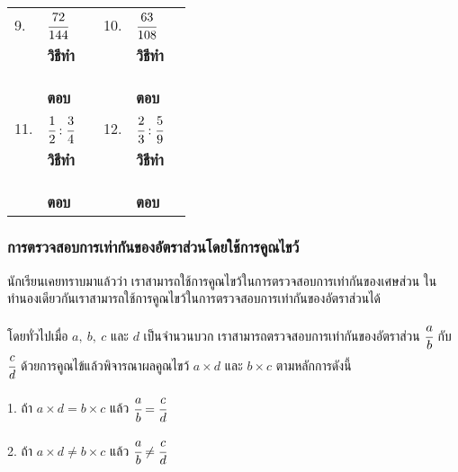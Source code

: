 \documentclass[
  a4paper,
  DIV=11,
  numbers=noendperiod]{scrartcl}
\begin{document}
\begin{longtable*}[l]{llp{5.5cm}|llp{5.5cm}}
9.  & $\cfrac{72}{144}$   &           & 10.  & $\cfrac{63}{108}$   & \\
    & \textbf{วิธีทำ}  &  \dotfill &     & \textbf{วิธีทำ}  & \dotfill\\
    &               &  \dotfill &     &                 & \dotfill\\ 
    &               &  \dotfill &     &                 & \dotfill\\ 
    &               &  \dotfill &     &                 & \dotfill\\ 
    & \textbf{ตอบ}  &  \dotfill &     & \textbf{ตอบ}  & \dotfill\\  

\newpage

11.  & $\cfrac{1}{2}:\cfrac{3}{4}$   &           & 12.  & $\cfrac{2}{3}:\cfrac{5}{9}$   & \\
    & \textbf{วิธีทำ}  &  \dotfill &     & \textbf{วิธีทำ}  & \dotfill\\
    &               &  \dotfill &     &                 & \dotfill\\ 
    &               &  \dotfill &     &                 & \dotfill\\ 
    &               &  \dotfill &     &                 & \dotfill\\ 
    & \textbf{ตอบ}  &  \dotfill &     & \textbf{ตอบ}  & \dotfill\\  

\end{longtable*}

\subsubsection{การตรวจสอบการเท่ากันของอัตราส่วนโดยใช้การคูณไขว้}\label{uxe01uxe32uxe23uxe15uxe23uxe27uxe08uxe2auxe2duxe1auxe01uxe32uxe23uxe40uxe17uxe32uxe01uxe19uxe02uxe2duxe07uxe2duxe15uxe23uxe32uxe2auxe27uxe19uxe42uxe14uxe22uxe43uxe0auxe01uxe32uxe23uxe04uxe13uxe44uxe02uxe27}

นักเรียนเคยทราบมาแล้วว่า เราสามารถใช้การคูณไขว้ในการตรวจสอบการเท่ากันของเศษส่วน
ในทำนองเดียวกันเราสามารถใช้การคูณไขว้ในการตรวจสอบการเท่ากันของอัตราส่วนได้

โดยทั่วไปเมื่อ \(a,\ b,\ c\) และ \(d\) เป็นจำนวนบวก
เราสามารถตรวจสอบการเท่ากันของอัตราส่วน \(\cfrac{a}{b}\) กับ \(\cfrac{c}{d}\)
ด้วยการคูณไข้แล้วพิจารณาผลคูณไขว้ \(a\times d\) และ \(b\times c\) ตามหลักการดังนี้

\centering
\begin{tcolorbox}[colback=white!5!white,
colframe=red!70!black,width=8cm]

1. ถ้า $a\times d=b\times c$ แล้ว $\cfrac{a}{b}=\cfrac{c}{d}$

2. ถ้า $a\times d\not= b\times c$ แล้ว $\cfrac{a}{b}\not=\cfrac{c}{d}$

\end{tcolorbox}
\end{document}
